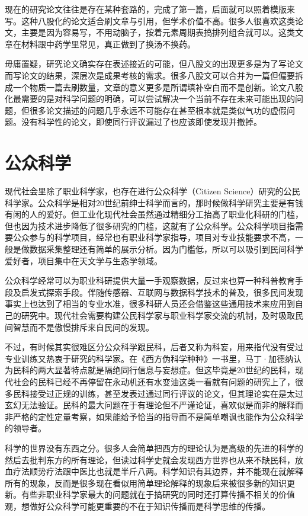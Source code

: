 \documentclass[]{tufte-book}
\begin{document}
现在的研究论文往往是存在某种套路的，完成了第一篇，后面就可以照着模版来写。这种八股化的论文适合刷文章与引用，但学术价值不高。很多人很喜欢这类论文，主要是因为容易写，不用动脑子，按着元素周期表搞排列组合就可以。这类文章在材料跟中药学里常见，真正做到了换汤不换药。

毋庸置疑，研究论文确实存在表述接近的可能，但八股文的出现更多是为了写论文而写论文的结果，深层次是成果考核的需求。很多八股文可以合并为一篇但偏要拆成一个物质一篇去刷数量，文章的意义更多是所谓填补空白而不是创新。论文八股化最需要的是对科学问题的明确，可以尝试解决一个当前不存在未来可能出现的问题，但很多论文描述的问题几乎永远不可能存在甚至根本就是类似气功的虚假问题。没有科学性的论文，即使同行评议漏过了也应该即使发现并撤掉。

\hypertarget{ux516cux4f17ux79d1ux5b66}{%
\section{公众科学}\label{ux516cux4f17ux79d1ux5b66}}

现代社会里除了职业科学家，也存在进行公众科学（Citizen Science）研究的公民科学家。公众科学是相对20世纪前绅士科学而言的，那时候做科学研究主要是有钱有闲的人的爱好。但工业化现代社会虽然通过精细分工抬高了职业化科研的门槛，但也因为技术进步降低了很多研究的门槛，这就有了公众科学。公众科学项目指需要公众参与的科学项目，经常也有职业科学家指导，项目对专业技能要求不高，一般是做数据采集整理还有简单的展示分析。因为门槛低，所以可以吸引到民间科学爱好者，项目集中在天文学与生态学领域。

公众科学经常可以为职业科研提供大量一手观察数据，反过来也算一种科普教育手段及启发式探索手段。伴随传感器、互联网与数据科学技术的普及，很多民间发现事实上也达到了相当的专业水准，很多科研人员还会借鉴这些通用技术来应用到自己的研究中。现代社会需要构建公民科学家与职业科学家交流的机制，及时吸取民间智慧而不是傲慢排斥来自民间的发现。

不过，有时候其实很难区分公众科学跟民科，后者又称为科妄，用来指代没有受过专业训练又热衷于研究的科学家。在《西方伪科学种种》一书里，马丁·加德纳认为民科的两大显著特点就是隔绝同行信息与妄想症。但这毕竟是20世纪的民科，现代社会的民科已经不再停留在永动机还有水变油这类一看就有问题的研究上了，很多民科接受过正规的训练，甚至发表过通过同行评议的论文，但其理论实在是太过玄幻无法验证。民科的最大问题在于有理论但不严谨论证，喜欢似是而非的解释而非严格的定性定量考察，如果能给予恰当的指导而不是简单嘲讽也能作为公众科学的领导者。

科学的世界没有东西之分。很多人会简单把西方的理论认为是高级的先进的科学的然后去批判东方的所有理论，但读过科学史就会发现西方世界也从来不缺民科，放血疗法顺势疗法跟中医比也就是半斤八两。科学知识有其边界，并不能现在就解释所有的现象，反而是很多现在看似用简单理论解释的现象后来被很多新的知识更新。有些非职业科学家最大的问题就在于搞研究的同时还打算传播不相关的价值观，想做好公众科学可能更重要的不在于知识传播而是科学思维的传播。
\end{document}
